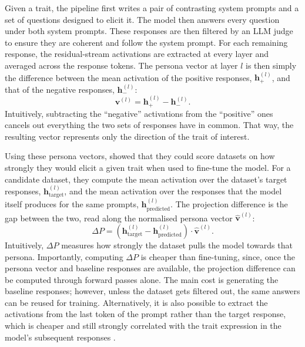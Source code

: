Given a trait, the pipeline first writes a pair of contrasting system prompts and a set of questions designed to elicit it. The model then answers every question under both system prompts. These responses are then filtered by an LLM judge to ensure they are coherent and follow the system prompt. For each remaining response, the residual-stream activations are extracted at every layer and averaged across the response tokens. The persona vector at layer $l$ is then simply the difference between the mean activation of the positive responses, $\mathbf{h}_{+}^{(l)}$, and that of the negative responses, $\mathbf{h}_{-}^{(l)}$:
\begin{equation}
    \mathbf{v}^{(l)} = \mathbf{h}_{+}^{(l)} - \mathbf{h}_{-}^{(l)}.
    \label{eq:persona_vector}
\end{equation}
Intuitively, subtracting the ``negative'' activations from the ``positive'' ones cancels out everything the two sets of responses have in common. That way, the resulting vector represents only the direction of the trait of interest.

Using these persona vectors, \cite{chen2025persona_vectors} showed that they could score datasets on how strongly they would elicit a given trait when used to fine-tune the model. For a candidate dataset, they compute the mean activation over the dataset's target responses, $\mathbf{h}_{\text{target}}^{(l)}$, and the mean activation over the responses that the model itself produces for the same prompts, $\mathbf{h}_{\text{predicted}}^{(l)}$. The projection difference is the gap between the two, read along the normalised persona vector $\hat{\mathbf{v}}^{(l)}$:
\begin{equation}
    \Delta P = \left(\mathbf{h}_{\text{target}}^{(l)} - \mathbf{h}_{\text{predicted}}^{(l)}\right)\cdot \hat{\mathbf{v}}^{(l)}.
    \label{eq:projection_difference}
\end{equation}
Intuitively, $\Delta P$ measures how strongly the dataset pulls the model towards that persona. Importantly, computing $\Delta P$ is cheaper than fine-tuning, since, once the persona vector and baseline responses are available, the projection difference can be computed through forward passes alone. The main cost is generating the baseline responses; however, unless the dataset gets filtered out, the same answers can be reused for training. Alternatively, it is also possible to extract the activations from the last token of the prompt rather than the target response, which is cheaper and still strongly correlated with the trait expression in the model's subsequent responses \citep{chen2025persona_vectors, nghiem2026traitspacemonitoringemergentmisalignment}.

